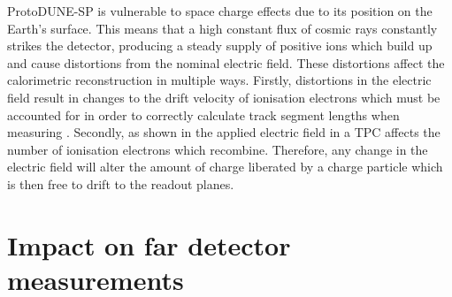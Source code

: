 ProtoDUNE-SP is vulnerable to space charge effects due to its position on the Earth's surface.
This means that a high constant flux of cosmic rays constantly strikes the detector, producing a steady supply of positive ions which build up and cause distortions from the nominal electric field.
These distortions affect the calorimetric reconstruction in multiple ways.
Firstly, distortions in the electric field result in changes to the drift velocity of ionisation electrons which must be accounted for in order to correctly calculate track segment lengths when measuring \dqdx.
Secondly, as shown in  the applied electric field in a TPC affects the number of ionisation electrons which recombine. 
Therefore, any change in the electric field will alter the amount of charge liberated by a charge particle which is then free to drift to the readout planes.



\section{Impact on far detector measurements}
\label{sec:pdune_calibration:fd}